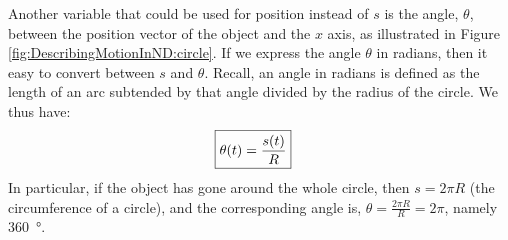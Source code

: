 Another variable that could be used for position instead of $s$ is the angle, $\theta$, between the position vector of the object and the $x$ axis, as illustrated in Figure \ref{fig:DescribingMotionInND:circle}. If we express the angle $\theta$ in radians, then it easy to convert between $s$ and $\theta$. Recall, an angle in radians is defined as the length of an arc subtended by that angle divided by the radius of the circle. We thus have:
\begin{align}
\label{eqn:DescribingMotionInND:raddef}
\Aboxed{\theta(t)=\frac{s(t)}{R}}
\end{align}
In particular, if the object has gone around the whole circle, then $s=2\pi R$ (the circumference of a circle), and the corresponding angle is, $\theta=\frac{2\pi R}{R}=2\pi$, namely \SI{360}{\degree}. 

